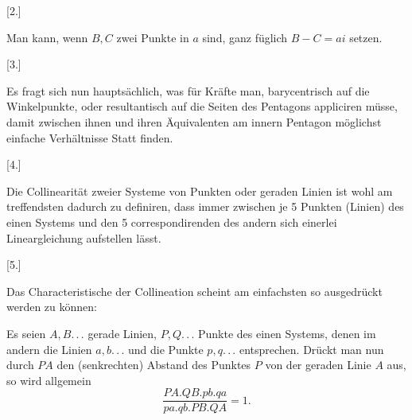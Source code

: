 \begin{center}
[2.]
\end{center}

Man kann, wenn $B, C$ zwei Punkte in $a$ sind, ganz füglich $B - C = ai$ setzen.

\begin{center}
[3.]
\end{center}

Es fragt sich nun hauptsächlich, was für Kräfte man, barycentrisch auf die Winkelpunkte, oder resultantisch auf die Seiten des Pentagons appliciren müsse, damit zwischen ihnen und ihren Äquivalenten am innern Pentagon möglichst einfache Verhältnisse Statt finden.

\begin{center}
[4.]
\end{center}

Die Collinearität zweier Systeme von Punkten oder geraden Linien ist wohl am treffendsten dadurch zu definiren, dass immer zwischen je 5 Punkten (Linien) des einen Systems und den 5 correspondirenden des andern sich einerlei Lineargleichung aufstellen lässt.

\begin{center}
[5.]
\end{center}

Das Characteristische der Collineation scheint am einfachsten so ausgedrückt werden zu können:

Es seien $A, B.\,.\,.$ gerade Linien, $P,Q.\,.\,.$ Punkte des einen Systems, denen im andern die Linien $a,b.\,.\,.$ und die Punkte $p,q.\,.\,.$ entsprechen. Drückt man nun durch $PA$ den (senkrechten) Abstand des Punktes $P$ von der geraden Linie $A$ aus, so wird allgemein
\[
\frac{PA.QB.pb.qa}{pa.qb.PB.QA} = 1.
\]
